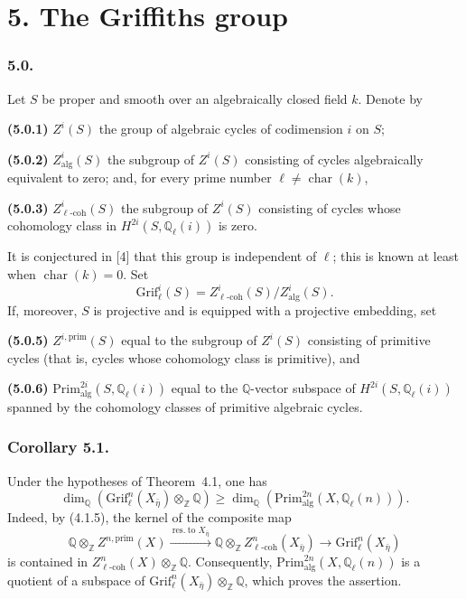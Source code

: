 \section*{5. The Griffiths group}

\subsubsection*{5.0.}
Let $S$ be proper and smooth over an algebraically closed field $k$.
Denote by

\medskip
\noindent\textbf{(5.0.1)} $Z^i(S)$ the group of algebraic cycles of
codimension $i$ on $S$;

\noindent\textbf{(5.0.2)} $Z^i_{\mathrm{alg}}(S)$ the subgroup of
$Z^i(S)$ consisting of cycles algebraically equivalent to zero; and, for
every prime number $\ell\ne\operatorname{char}(k)$,

\noindent\textbf{(5.0.3)} $Z^i_{\ell\text{-}\mathrm{coh}}(S)$ the subgroup
of $Z^i(S)$ consisting of cycles whose cohomology class in
$H^{2i}(S,\mathbb Q_\ell(i))$ is zero.

It is conjectured in \textup{[4]} that this group is independent of $\ell$;
this is known at least when $\operatorname{char}(k)=0$.  Set
\begin{equation}\tag{5.0.4}
\mathrm{Grif}^i_\ell(S)
 =Z^i_{\ell\text{-}\mathrm{coh}}(S)/Z^i_{\mathrm{alg}}(S).
\end{equation}
If, moreover, $S$ is projective and is equipped with a projective embedding,
set

\medskip
\noindent\textbf{(5.0.5)} $Z^{i,\mathrm{prim}}(S)$ equal to the subgroup
of $Z^i(S)$ consisting of primitive cycles (that is, cycles whose
cohomology class is primitive), and

\noindent\textbf{(5.0.6)}
$\mathrm{Prim}^{2i}_{\mathrm{alg}}(S,\mathbb Q_\ell(i))$ equal to the
$\mathbb Q$-vector subspace of $H^{2i}(S,\mathbb Q_\ell(i))$ spanned by
the cohomology classes of primitive algebraic cycles.

\subsubsection*{Corollary 5.1.}
Under the hypotheses of Theorem~4.1, one has
\begin{equation}\tag{5.1.1}
\dim_{\mathbb Q}\!\left(
  \mathrm{Grif}^n_\ell(X_{\bar\eta})\otimes_{\mathbb Z}\mathbb Q
\right)
\geq
\dim_{\mathbb Q}\!\left(
  \mathrm{Prim}^{2n}_{\mathrm{alg}}(X,\mathbb Q_\ell(n))
\right).
\end{equation}
Indeed, by (4.1.5), the kernel of the composite map
\begin{equation*}
\mathbb Q\otimes_{\mathbb Z}Z^{n,\mathrm{prim}}(X)
 \xrightarrow{\ \mathrm{res.}\ \text{to }X_{\bar\eta}\ }
\mathbb Q\otimes_{\mathbb Z}Z^n_{\ell\text{-}\mathrm{coh}}
  (X_{\bar\eta})
 \longrightarrow \mathrm{Grif}^n_\ell(X_{\bar\eta})
\end{equation*}
is contained in
$Z^n_{\ell\text{-}\mathrm{coh}}(X)\otimes_{\mathbb Z}\mathbb Q$.
Consequently,
$\mathrm{Prim}^{2n}_{\mathrm{alg}}(X,\mathbb Q_\ell(n))$ is a quotient
of a subspace of
$\mathrm{Grif}^n_\ell(X_{\bar\eta})\otimes_{\mathbb Z}\mathbb Q$,
which proves the assertion.

